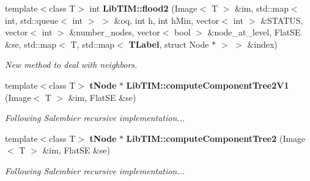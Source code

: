 \begin{CompactItemize}
\item 
template$<$class T$>$ int {\bf Lib\-TIM::flood2} (Image$<$ T $>$ \&im, std::map$<$ int, std::queue$<$ int $>$ $>$ \&oq, int h, int h\-Min, vector$<$ int $>$ \&STATUS, vector$<$ int $>$ \&number\_\-nodes, vector$<$ bool $>$ \&node\_\-at\_\-level, Flat\-SE \&se, std::map$<$ T, std::map$<$ {\bf TLabel}, struct Node $\ast$ $>$ $>$ \&index)
\begin{CompactList}\small\item\em New method to deal with neighbors. \item\end{CompactList}\item 
template$<$class T$>$ {\bf t\-Node} $\ast$ {\bf Lib\-TIM::compute\-Component\-Tree2V1} (Image$<$ T $>$ \&im, Flat\-SE \&se)
\begin{CompactList}\small\item\em Following Salembier recursive implementation... \item\end{CompactList}\item 
template$<$class T$>$ {\bf t\-Node} $\ast$ {\bf Lib\-TIM::compute\-Component\-Tree2} (Image$<$ T $>$ \&im, Flat\-SE \&se)
\begin{CompactList}\small\item\em Following Salembier recursive implementation... \item\end{CompactList}\end{CompactItemize}
